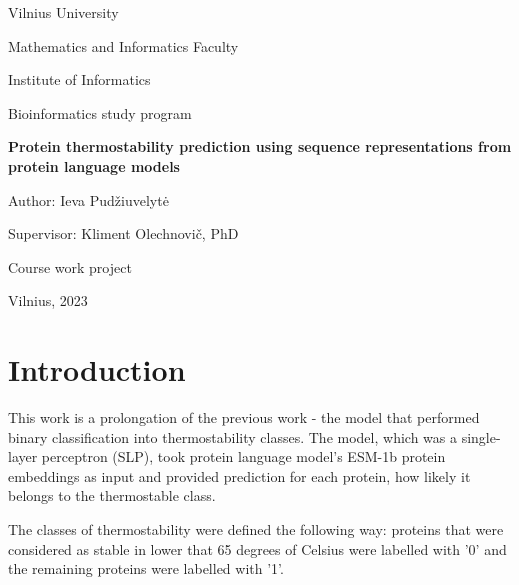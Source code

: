 \documentclass[12pt]{article}
\begin{document}
	\begin{center}

	    \vspace*{1cm}
	    \Large
	    Vilnius University

		Mathematics and Informatics Faculty

		Institute of Informatics 

		Bioinformatics study program
	    
        \vspace*{2cm}
        \Large
		\textbf{Protein thermostability prediction using 
		sequence representations from protein 
		language models}

	\end{center}

	\begin{flushright}

		\vspace*{2cm}
        \large
        Author: Ieva Pudžiuvelytė

        Supervisor: Kliment Olechnovič, PhD 
        
	\end{flushright}

	\begin{center}
		\vspace*{4cm}
        \large
        Course work project
        
        \vspace*{2cm}
        \large
        Vilnius, 2023
	\end{center}
	
	\newpage

	\tableofcontents

	\newpage
	
	\section{Introduction}

	This work is a prolongation of the previous work - the model 
	that performed binary classification into thermostability 
	classes. The model, which was a single-layer perceptron (SLP), 
    took protein language model's ESM-1b \cite{rives2021biological} 
	protein embeddings as input 
	and provided prediction for each protein, how likely it 
	belongs to the thermostable class.

    The classes of thermostability were defined the following 
    way: proteins that were considered as stable in lower that 
    65 degrees of Celsius were labelled with '0' and the remaining
	proteins were labelled with '1'. 
    
\end{document}

